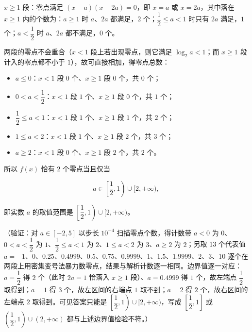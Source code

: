 \begin{answer}
\(x\geqslant1\) 段：零点满足 \((x-a)(x-2a)=0\)，即 \(x=a\) 或 \(x=2a\)，其中落在 \(x\geqslant1\) 内的个数为：\(a\geqslant1\) 时 \(a\)、\(2a\) 都满足，\(2\) 个；\(\dfrac{1}{2}\leqslant a<1\) 时只有 \(2a\) 满足，\(1\) 个；\(a<\dfrac{1}{2}\) 时 \(a\)、\(2a\) 都不满足，\(0\) 个。

两段的零点不会重合（\(x<1\) 段上若出现零点，则它满足 \(\log_{2}a<1\)；而 \(x\geqslant1\) 段计入的零点都不小于 \(1\)），故可直接相加，得零点总数：

\begin{itemize}
\item \(a\leqslant0\)：\(x<1\) 段 \(0\) 个、\(x\geqslant1\) 段 \(0\) 个，共 \(0\) 个；
\item \(0<a<\dfrac{1}{2}\)：\(x<1\) 段 \(1\) 个、\(x\geqslant1\) 段 \(0\) 个，共 \(1\) 个；
\item \(\dfrac{1}{2}\leqslant a<1\)：\(x<1\) 段 \(1\) 个、\(x\geqslant1\) 段 \(1\) 个，共 \(2\) 个；
\item \(1\leqslant a<2\)：\(x<1\) 段 \(1\) 个、\(x\geqslant1\) 段 \(2\) 个，共 \(3\) 个；
\item \(a\geqslant2\)：\(x<1\) 段 \(0\) 个、\(x\geqslant1\) 段 \(2\) 个，共 \(2\) 个。
\end{itemize}

所以 \(f(x)\) 恰有 \(2\) 个零点当且仅当

\nopagebreak[4]
\[
a\in\left[\frac{1}{2},1\right)\cup[2,+\infty),
\]

即实数 \(a\) 的取值范围是 \(\left[\dfrac{1}{2},1\right)\cup[2,+\infty)\)。

（验证：对 \(a\in[-2,5]\) 以步长 \(10^{-4}\) 扫描零点个数，得计数带 \(a<0\) 为 \(0\)、\(0<a<\dfrac{1}{2}\) 为 \(1\)、\(\dfrac{1}{2}\leqslant a<1\) 为 \(2\)、\(1\leqslant a<2\) 为 \(3\)、\(a\geqslant2\) 为 \(2\)；另取 13 个代表值 \(a=-1\)、\(0\)、\(0.25\)、\(0.4999\)、\(0.5\)、\(0.75\)、\(0.9999\)、\(1\)、\(1.5\)、\(1.9999\)、\(2\)、\(3\)、\(10\) 逐个在两段上用密集变号法暴力数零点，结果与解析计数逐一相同。边界值逐一对应：\(a=\dfrac{1}{2}\) 得 \(2\) 个（此时 \(2a=1\) 恰落入 \(x\geqslant1\) 段）、\(a=0.4999\) 得 \(1\) 个，故左端点 \(\dfrac{1}{2}\) 取得到；\(a=1\) 得 \(3\) 个，故左区间的右端点 \(1\) 取不到；\(a=2\) 得 \(2\) 个，故右区间的左端点 \(2\) 取得到。可见答案只能是 \(\left[\dfrac{1}{2},1\right)\cup[2,+\infty)\)，写成 \(\left[\dfrac{1}{2},1\right]\) 或 \(\left(\dfrac{1}{2},1\right)\cup(2,+\infty)\) 都与上述边界值检验不符。）

\gkanswer{答案：① \(-1\)；② \(\left[\dfrac{1}{2},1\right)\cup[2,+\infty)\)}

\end{answer}
